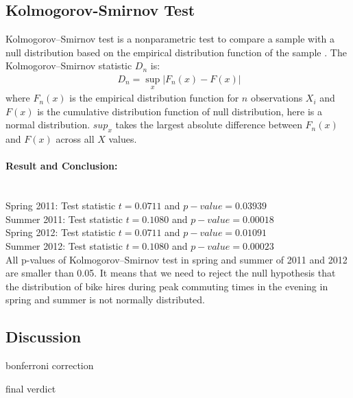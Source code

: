 \subsection{Kolmogorov-Smirnov Test}

Kolmogorov–Smirnov test is a nonparametric test to compare a sample with a null distribution based on the empirical distribution function of the sample \cite{berger2014kolmogorov}. The Kolmogorov–Smirnov statistic $D_n$ is:
\begin{eqnarray}
\ D_n = \sup_{x} |F_n(x)-F(x)|
\end{eqnarray}
where $F_n(x)$ is the empirical distribution function for $n$ observations $X_i$ and $F(x)$ is the cumulative distribution function of null distribution, here is a normal distribution. $sup_{x}$ takes the largest absolute difference between $F_n(x)$ and $F(x)$ across all $X$ values.

\paragraph{Result and Conclusion:} ~\\

Spring 2011: Test statistic $t=0.0711$ and $p-value = 0.03939$ \\
Summer 2011: Test statistic $t=0.1080$ and $p-value = 0.00018$ \\
Spring 2012: Test statistic $t=0.0711$ and $p-value = 0.01091$ \\
Summer 2012: Test statistic $t=0.1080$ and $p-value = 0.00023$\\

All p-values of Kolmogorov–Smirnov test in spring and summer of 2011 and 2012 are smaller than 0.05. It means that we need to reject the null hypothesis that the distribution of bike hires during peak commuting times in the evening in spring and summer is not normally distributed.
 
\subsection{Discussion}
bonferroni correction

final verdict





































